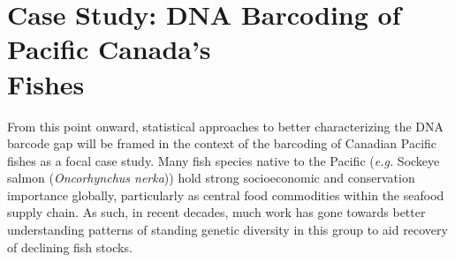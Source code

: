 \section{Case Study: DNA Barcoding of Pacific Canada's \\ Fishes}

From this point onward, statistical approaches to better characterizing the DNA barcode gap will be framed in the context of the barcoding of Canadian Pacific fishes as a focal case study. Many fish species native to the Pacific (\textit{e.g.} Sockeye salmon (\textit{Oncorhynchus nerka})) hold strong socioeconomic and conservation importance globally, particularly as central food commodities within the seafood supply chain. As such, in recent decades, much work has gone towards better understanding patterns of standing genetic diversity in this group to aid recovery of declining fish stocks.   



